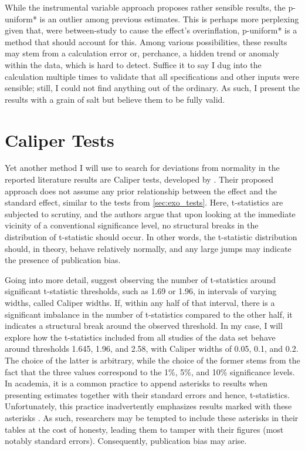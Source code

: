 While the instrumental variable approach proposes rather sensible results, the p-uniform* is an outlier among previous estimates. This is perhaps more perplexing given that, were between-study to cause the effect's overinflation, p-uniform* is a method that should account for this. Among various possibilities, these results may stem from a calculation error or, perchance, a hidden trend or anomaly within the data, which is hard to detect. Suffice it to say I dug into the calculation multiple times to validate that all specifications and other inputs were sensible; still, I could not find anything out of the ordinary. As such, I present the results with a grain of salt but believe them to be fully valid.


\section{Caliper Tests}
\label{sec:caliper}

Yet another method I will use to search for deviations from normality in the reported literature results are Caliper tests, developed by \cite{gerber2008caliper}. Their proposed approach does not assume any prior relationship between the effect and the standard effect, similar to the tests from \autoref{sec:exo_tests}. Here, t-statistics are subjected to scrutiny, and the authors argue that upon looking at the immediate vicinity of a conventional significance level, no structural breaks in the distribution of t-statistic should occur. In other words, the t-statistic distribution should, in theory, behave relatively normally, and any large jumps may indicate the presence of publication bias.

Going into more detail, \cite{gerber2008caliper} suggest observing the number of t-statistics around significant t-statistic thresholds, such as 1.69 or 1.96, in intervals of varying widths, called Caliper widths. If, within any half of that interval, there is a significant imbalance in the number of t-statistics compared to the other half, it indicates a structural break around the observed threshold. In my case, I will explore how the t-statistics included from all studies of the data set behave around thresholds 1.645, 1.96, and 2.58, with Caliper widths of 0.05, 0.1, and 0.2. The choice of the latter is arbitrary, while the choice of the former stems from the fact that the three values correspond to the 1\%, 5\%, and 10\% significance levels. In academia, it is a common practice to append asterisks to results when presenting estimates together with their standard errors and hence, t-statistics. Unfortunately, this practice inadvertently emphasizes results marked with these asterisks \citep{simmons2011false}. As such, researchers may be tempted to include these asterisks in their tables at the cost of honesty, leading them to tamper with their figures (most notably standard errors). Consequently, publication bias may arise.

